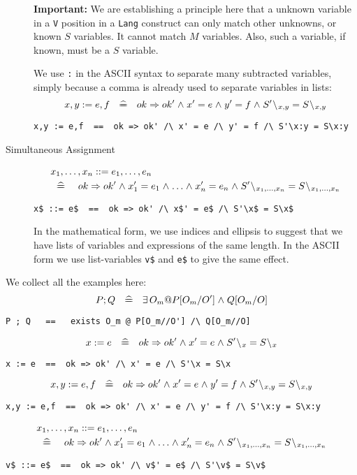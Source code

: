 \begin{description}
\textbf{Important:}
We are establishing a principle here that a unknown variable
in a \texttt{V} position in a \texttt{Lang} construct can only match other unknowns,
or known $S$ variables. It cannot match $M$ variables.
Also, such a variable, if known, must be a $S$ variable.
\par
We use \verb":" in the ASCII syntax to separate many subtracted variables,
simply because a comma is already used to separate variables in lists:
$$
  x,y := e,f ~\defs~ ok \implies ok' \land x' = e \land y'=f
    \land S'\less{x,y} = S\less{x,y}
$$
\begin{verbatim}
x,y := e,f  ==  ok => ok' /\ x' = e /\ y' = f /\ S'\x:y = S\x:y
\end{verbatim}
\item[Simultaneous Assignment]
\begin{eqnarray*}
  \lefteqn{x_1,\ldots,x_n ::= e_1, \ldots , e_n}
\\ &\defs&
     ok \implies ok'
     \land x'_1 = e_1 \land \ldots \land x'_n = e_n
     \land S'\less{x_1,\ldots,x_n} = S\less{x_1,\ldots,x_n}
\end{eqnarray*}
\begin{verbatim}
x$ ::= e$  ==  ok => ok' /\ x$' = e$ /\ S'\x$ = S\x$
\end{verbatim}
In the mathematical form, we use indices and ellipsis
to suggest that we have lists of variables and expressions
of the same length.
In the ASCII form we use list-variables \verb"v$"
and \verb"e$" to give the same effect.
\end{description}

We collect all the examples here:
$$
  P ; Q ~\defs~ \exists O_m @ P[O_m/O'] \land Q[O_m/O]
$$
\begin{verbatim}
P ; Q   ==   exists O_m @ P[O_m//O'] /\ Q[O_m//O]
\end{verbatim}
$$
  x := e ~\defs~ ok \implies ok' \land x' = e
    \land S'\less x = S\less x
$$
\begin{verbatim}
x := e  ==  ok => ok' /\ x' = e /\ S'\x = S\x
\end{verbatim}
$$
  x,y := e,f ~\defs~ ok \implies ok' \land x' = e \land y'=f
    \land S'\less{x,y} = S\less{x,y}
$$
\begin{verbatim}
x,y := e,f  ==  ok => ok' /\ x' = e /\ y' = f /\ S'\x:y = S\x:y
\end{verbatim}
\begin{eqnarray*}
  \lefteqn{x_1,\ldots,x_n ::= e_1, \ldots , e_n}
\\ &\defs&
     ok \implies ok'
     \land x'_1 = e_1 \land \ldots \land x'_n = e_n
     \land S'\less{x_1,\ldots,x_n} = S\less{x_1,\ldots,x_n}
\end{eqnarray*}
\begin{verbatim}
v$ ::= e$  ==  ok => ok' /\ v$' = e$ /\ S'\v$ = S\v$
\end{verbatim}

